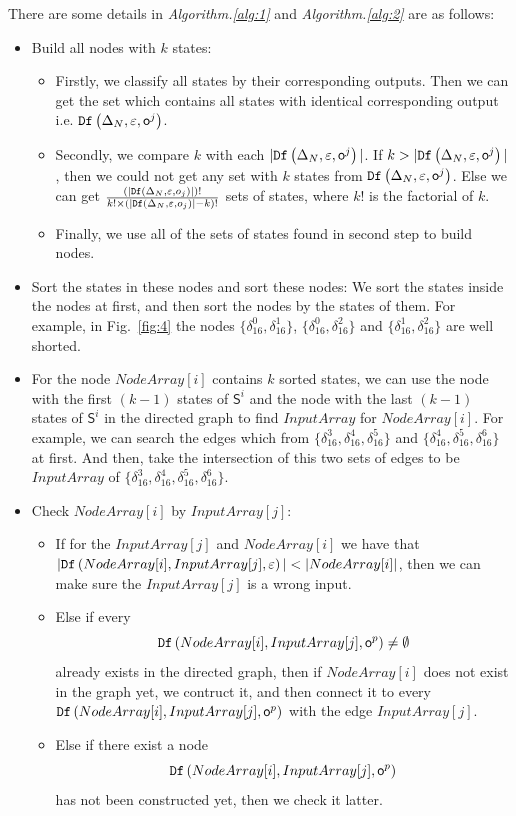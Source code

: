 There are some details in {\em Algorithm.\ref{alg:1}} and {\em Algorithm.\ref{alg:2}} are as follows:
\begin{itemize}
\item Build all nodes with $k$ states:
\begin{itemize}
\item Firstly, we classify all states by their corresponding outputs. Then we can get the set which contains all states with identical corresponding output i.e. ${\tt Df}\left(\Delta_N,\varepsilon,\mathsf{o}^{j}\right)$.
\item Secondly, we compare $k$ with each $|{\tt Df}\left(\Delta_N,\varepsilon,\mathsf{o}^{j}\right)|$. If $k>|{\tt Df}\left(\Delta_N,\varepsilon,\mathsf{o}^{j}\right)|$, then we could not get any set with $k$ states from ${\tt Df}\left(\Delta_N,\varepsilon,\mathsf{o}^{j}\right)$. Else we can get $\frac{(|{\tt Df}\left(\Delta_N,\varepsilon,o_j\right)|)!}{k!\times (|{\tt Df}\left(\Delta_N,\varepsilon,o_j\right)|-k)!}$ sets of states, where $k!$ is the factorial of $k$.
\item Finally, we use all of the sets of states found in second step to build nodes. 
\end{itemize} 
 \item Sort the states in these nodes and sort these nodes: We sort the states inside the nodes at first, and then sort the nodes by the states of them. For example, in Fig.~\ref{fig:4} the nodes $\{\delta_{16}^0,\delta_{16}^1\}$, $\{\delta_{16}^0,\delta_{16}^2\}$ and $\{\delta_{16}^1,\delta_{16}^2\}$ are well shorted. 
  \item 
   For the node $NodeArray[i]$ contains $k$ sorted states, we can use the node with the first $(k-1)$ states of $\mathsf{S}^i$ and the node with the last $(k-1)$ states of $\mathsf{S}^i$ in the directed graph to find $InputArray$ for $NodeArray[i]$. For example, we can search the edges which from $\{\delta_{16}^3,\delta_{16}^4,\delta_{16}^5\}$ and $\{\delta_{16}^4,\delta_{16}^5,\delta_{16}^6\}$ at first. And then, take the intersection of this two sets of edges to be $InputArray$ of $\{\delta_{16}^3,\delta_{16}^4,\delta_{16}^5,\delta_{16}^6\}$. 
  \item Check $NodeArray[i]$ by $InputArray[j]$:
     
\begin{itemize}
\item If for the $InputArray[j]$ and $NodeArray[i]$ we have that $|\Ded\left(NodeArray[i],InputArray[j],\varepsilon\right)|<|NodeArray[i]|$, then we can make sure the $InputArray[j]$ is a wrong input.
\item Else if every \[{\tt Df}\left(NodeArray[i],InputArray[j],\mathsf{o}^{p}\right)\ne\emptyset\] already exists in the directed graph, then if $NodeArray[i]$ does not exist in the graph yet, we contruct it, and then connect it to every ${\tt Df}\left(NodeArray[i],InputArray[j],\mathsf{o}^{p}\right)$ with the edge $InputArray[j]$.
\item Else if there exist a node \[{\tt Df}\left(NodeArray[i],InputArray[j],\mathsf{o}^{p}\right)\] has not been constructed yet, then we check it latter. 
\end{itemize} 
\end{itemize} 

